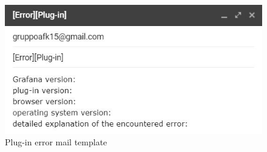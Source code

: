 \begin{figure}[H]
\centering
\includegraphics[scale=0.85]{img/mail/plug-in_mail.png}
\caption{Plug-in error mail template}
\end{figure}